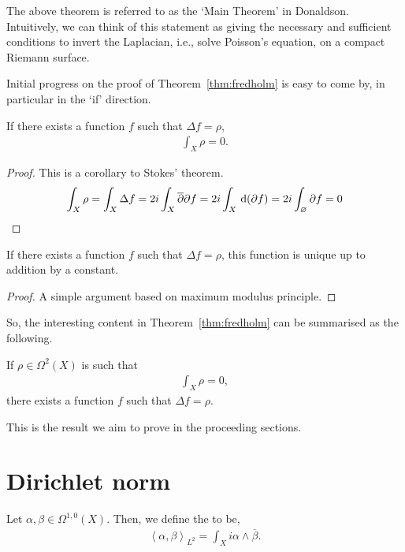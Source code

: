 The above theorem is referred to as the `Main Theorem' in
Donaldson. Intuitively, we can
think of this statement as giving the necessary and sufficient conditions to
invert the Laplacian, i.e., solve Poisson's equation, on a compact Riemann
surface.

Initial progress on the proof of Theorem~\ref{thm:fredholm} is easy to come by,
in particular in the `if' direction.

\begin{lemma}
	If there exists a function $ f $ such that $ \Delta f = \rho $,
	\begin{align*}
		\int_{X}{\rho} = 0.
	\end{align*}
	\begin{proof}
		This is a corollary to Stokes' theorem.
		\begin{align*}
			\int_{X}{\rho}  = \int_{X}{\Delta f}
			= 2i \int_{X}{\overline{\partial}\partial f}
			= 2i \int_{X}{\operatorname{\, d\!}{\left( \partial f \right)}}
			= 2i \int_{\varnothing}{\partial f} = 0
		\end{align*}
	\end{proof}
\end{lemma}

\begin{lemma}
	If there exists a function $ f $ such that $ \Delta f = \rho $, this function
	is unique up to addition by a constant.
	\begin{proof}
		A simple argument based on maximum modulus principle.
	\end{proof}
\end{lemma}

So, the interesting content in Theorem~\ref{thm:fredholm} can be summarised as
the following.

\begin{theorem}\label{thm:main-thm}
	If $ \rho \in \Omega^2(X) $ is such that
	\begin{align*}
		\int_{X}{\rho} = 0,
	\end{align*}
	there exists a function $ f $ such that $ \Delta f = \rho $.
\end{theorem}

This is the result we aim to prove in the proceeding sections.

\section{Dirichlet norm}
\begin{definition}
	Let $ \alpha, \beta \in \Omega ^{1,0}(X) $. Then, we define the  to be,
	\begin{align*}
		\left\langle \alpha, \beta \right\rangle _{L^2} = \int_{X}{i \alpha \wedge
			\overline{\beta}}.
	\end{align*}
\end{definition}

